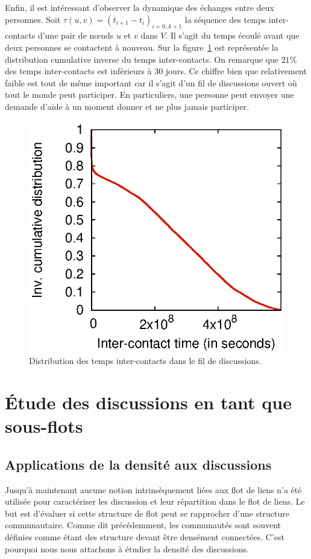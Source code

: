 Enfin, il est intéressant d'observer la dynamique des échanges entre deux personnes.
Soit $\tau(u,v) = (t_{i+1}-t_i)_{i=0..k+1}$ la séquence des temps inter-contacts d'une pair de n\oe uds $u$ et $v$ dans $V$.
Il s'agit du temps écoulé avant que deux personnes se contactent à nouveau.
Sur la figure~\ref{fig:ict_discussion} est représentée la distribution cumulative inverse du temps inter-contacts. 
On remarque que $21\%$ des temps inter-contacts est inférieurs à 30 jours.
Ce chiffre bien que relativement faible est tout de même important car il s'agit d'un fil de discussions ouvert où tout le monde peut participer. 
En particuliers, une personne peut envoyer une demande d'aide à un moment donner et ne plus jamais participer.
\begin{figure}
	\centering
	\includegraphics[width=0.49\linewidth]{img/mailing/ict-ccdf.eps}
	\caption{Distribution des temps inter-contacts dans le fil de discussions.}
	\label{fig:ict_discussion}
\end{figure}

\section{\'Etude des discussions en tant que sous-flots}
\subsection{Applications de la densité aux discussions}

Jusqu'à maintenant aucune notion intrinsèquement liées aux flot de liens n'a été utilisée pour caractériser les discussion et leur répartition dans le flot de liens.
Le but est d'évaluer si cette structure de flot peut se rapprocher d'une structure communautaire.
Comme dit précédemment, les communautés sont souvent définies comme étant des structure devant être densément connectées.
C'est pourquoi nous nous attachons à étudier la densité des discussions.

